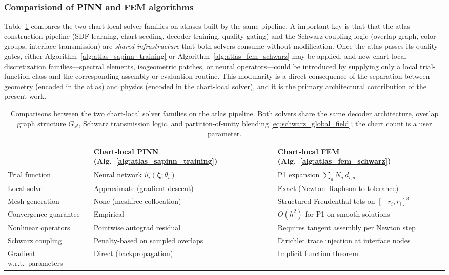 \documentclass[sort&compress]{svjour3} %
\begin{document}
\subsubsection{Comparisiond of PINN and FEM algorithms}
\label{sec:pinn_vs_fem}

Table~\ref{tab:pinn_vs_fem} compares the two chart-local solver families on atlases built by the same pipeline. A important key is that that the atlas construction pipeline (SDF learning, chart seeding, decoder training, quality gating) and the Schwarz coupling logic (overlap graph, color groups, interface transmission) are \emph{shared infrastructure} that both solvers consume without modification. 
Once the atlas passes its quality gates, either Algorithm~\ref{alg:atlas_sapinn_training} or Algorithm~\ref{alg:atlas_fem_schwarz} may be applied, and new chart-local discretization families---spectral elements, isogeometric patches, or neural operators---could be introduced by supplying only a local trial-function class and the corresponding assembly or evaluation routine. This modularity is a direct consequence of the separation between geometry (encoded in the atlas) and physics (encoded in the chart-local solver), and it is the primary architectural contribution of the present work.

\begin{table}[htbp]
\centering
\small
\setlength{\tabcolsep}{4pt}
\caption{Comparisons between the two chart-local solver families on the atlas pipeline. Both solvers share the same decoder architecture, overlap graph structure $G_{\mathcal{A}}$, Schwarz transmission logic, and partition-of-unity blending \eqref{eq:schwarz_global_field}; the chart count is a user parameter.}
\label{tab:pinn_vs_fem}
\begin{tabular}{p{3.5cm}p{5.2cm}p{5.2cm}}
\toprule
& \textbf{Chart-local PINN} (Alg.~\ref{alg:atlas_sapinn_training}) & \textbf{Chart-local FEM} (Alg.~\ref{alg:atlas_fem_schwarz}) \\
\midrule
Trial function & Neural network $\widehat{u}_i(\boldsymbol{\zeta};\theta_i)$ & P1 expansion $\sum_a N_a\,d_{i,a}$ \\
Local solve & Approximate (gradient descent) & Exact (Newton--Raphson to tolerance) \\
Mesh generation & None (meshfree collocation) & Structured Freudenthal tets on $[-r_i,r_i]^3$ \\
Convergence guarantee & Empirical & $O(h^2)$ for P1 on smooth solutions \\
Nonlinear operators & Pointwise autograd residual & Requires tangent assembly per Newton step \\
Schwarz coupling & Penalty-based on sampled overlaps & Dirichlet trace injection at interface nodes \\
Gradient w.r.t.\ parameters & Direct (backpropagation) & Implicit function theorem \\
\bottomrule
\end{tabular}
\end{table}
\end{document}
